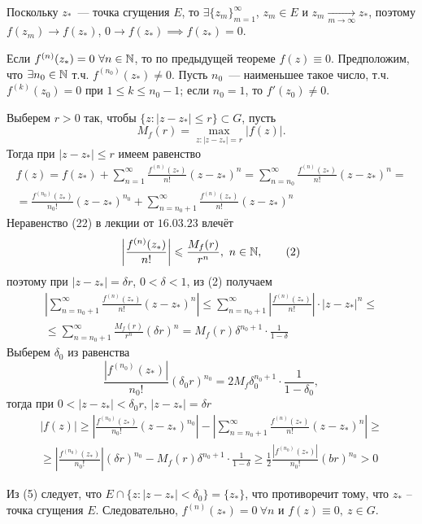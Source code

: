 \documentclass[main]{subfiles}
\begin{document}
\begin{longProof}
    Поскольку $z_*$~--- точка сгущения $E$, то $\exists \{z_m\}_{m = 1}^\infty$, $z_m \in E$ и $z_m \xrightarrow[m\to\infty]{} z_*$, поэтому $f(z_m) \to f(z_*)$, $0\to f(z_*) \implies f(z_*) = 0$.

    Если $f^{(n)}(z_*) = 0\ \forall n \in \mathbb{N}$, то по предыдущей теореме $f(z) \equiv 0$.
    Предположим, что $\exists n_0 \in \mathbb{N}$ т.ч. $f^{(n_0)}(z_*) \neq 0$.
    Пусть $n_0$~--- наименьшее такое число, т.ч. $f^{(k)}(z_0) = 0$ при $1 \le  k \le n_0 - 1$; если $n_0 = 1$, то $f'(z_0) \neq 0$.

    Выберем $r > 0$ так, чтобы $\{z:|z - z_*| \le r\} \subset G$, пусть
    \[M_f(r)=\max_{z:|z-z_*|=r} |f(z)|.\]
    Тогда при $|z - z_*| \le r$ имеем равенство
    \begin{multline*}
        f(z) = f(z_*) + \sum_{n = 1}^\infty \frac{f^{(n)}(z_*)}{n!} (z-z_*)^n = \sum \limits_{n = n_0}^\infty \frac{f^{(n)} (z_*)}{n!} (z-z_*)^n = \\
        = \frac{f^{(n_0)}(z_*)}{n_0!} (z-z_*)^{n_0} + \sum_{n = n_0 + 1}^\infty \frac{f^{(n)}(z_*)}{n!} (z - z_*)^n\tag{1}
    \end{multline*}
    Неравенство (22) в лекции от $16.03.23$ влечёт %
    \[ \left| \frac{f^{(n)}(z_*)}{n!} \right| \leqslant \frac{M_f(r)}{r^n},\ n \in \mathbb{N},\tag{2} \]
    поэтому при $|z - z_*| =  \delta r$, $0 < \delta < 1$, из (2) получаем
    \begin{multline*}
        \left| \sum_{n = n_0 + 1}^\infty \frac{f^{(n)}(z_*)}{n!} (z-z_*)^n \right| \le \sum_{n = n_0 + 1}^\infty \left| \frac{f^{(n)}(z_*)}{n!} \right| \cdot |z-z_*|^n \le\\
        \le \sum_{n = n_0 + 1}^\infty \frac{M_f(r)}{r^n} (\delta r)^n = M_f(r) \delta^{n_0+1} \cdot \frac{1}{1 - \delta}\tag{3}
    \end{multline*}
    Выберем $\delta_0$ из равенства
    \[ \frac{|f^{(n_0)}(z_*)|}{n_0!} (\delta_0 r)^{n_0} = 2 M_f \delta_0^{n_0 + 1} \cdot \frac{1}{1 - \delta_0}, \tag{4} \]
    тогда при $0 < |z - z_*| < \delta_0 r$, $|z - z_*| = \delta r$
    \begin{multline*}
        |f(z)| \ge \left| \frac{f^{(n_0)}(z_*)}{n_0!} (z - z_*)^{n_0} \right| - \left|\sum_{n = n_0 + 1}^\infty \frac{f^{(n)} (z_*)}{n!} (z-z_*)^n \right| \ge                                    \\
        \ge \left| \frac{f^{(n_0)}(z_*)}{n_0!} \right| (\delta r)^{n_0} - M_f(r) \delta^{n_0 + 1} \cdot \frac{1}{1 - \delta} \ge \frac{1}{2}\frac{|f^{(n_0)}(z_*)|}{n_0!} (br)^{n_0} > 0 \tag{5}
    \end{multline*}

    Из (5) следует, что $E\cap\{z:|z-z_*|<\delta_0\}=\{z_*\}$, что противоречит тому, что $z_*$ -- точка сгущения $E$. Следовательно, $f^{(n)}(z_*)=0\ \forall n$ и $f(z)\equiv 0,\ z\in G$.
\end{longProof}
\end{document}
